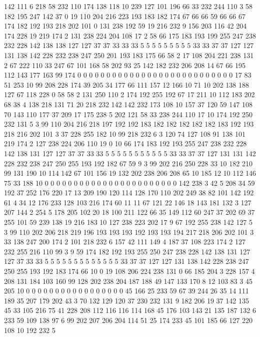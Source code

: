 142 111 6 218 58 232 110 174 138 118 10 239 127 101 196 66 33 232 244 110
3 58 182 195 247 142 37 0 19 110 204 216 223 193 183 182 174 67 66 66
59 66 66 67 174 182 192 193 218 202 101 0 131 238 192 59 19 216 232 9
156 203 116 42 204 174 228 19 219 174 2 131 238 224 204 108 17 2 58 66
175 183 193 199 255 247 238 232 228 142 138 138 127 127 37 37 33 33 33 5
5 5 5 5 5 5 5 5 33 33 37 37 127 127 131 138 142 228 232 238
247 250 201 193 183 175 66 58 2 17 108 204 221 238 131 2 67 222 110 33
247 67 101 168 58 202 93 25 142 182 232 206 208 14 67 66 195 112 143 177
163 99 174 0 0 0 0 0 0 0 0 0 0 0 0 0 0 0 0 0
0 0 0 0 0 0 0 0 0 0 17 83 51 253 10 99 208 228 174 39
205 34 177 66 111 157 12 166 10 71 10 202 138 188 127 67 118 228 0 58
58 2 131 250 110 2 174 192 255 192 67 17 211 10 112 183 202 68 38 4
138 218 131 71 20 218 232 142 142 232 173 108 10 157 37 120 59 147 108 70
143 110 177 37 209 17 175 238 5 202 121 58 33 238 244 110 17 10 174 192
250 232 131 5 3 99 110 204 216 218 197 192 192 183 182 182 182 182 182 183
192 193 218 216 202 101 3 37 228 255 182 10 99 218 232 6 3 120 74 127
108 91 138 101 219 174 2 127 238 224 206 110 19 0 10 66 174 183 192 193
255 247 238 232 228 142 138 131 127 127 37 37 33 33 5 5 5 5 5 5
5 5 5 5 5 33 33 37 37 127 131 131 142 228 232 238 247 250 255 193
192 182 67 59 9 3 99 202 216 250 228 33 10 182 210 99 131 190 10 114
142 67 101 156 19 132 202 238 206 208 65 10 185 12 10 112 146 75 33 188
10 0 0 0 0 0 0 0 0 0 0 0 0 0 0 0 0 0 0 0
0 0 0 0 142 238 3 42 5 208 34 59 192 37 252 176 220 17 13 209
190 120 114 128 170 110 202 249 38 82 101 142 192 61 4 34 12 176 233 128
103 216 174 60 11 11 67 121 22 146 18 143 181 132 3 127 207 144 2 254
5 178 205 102 20 18 100 211 122 66 35 149 112 60 247 37 202 69 37 255
101 59 239 138 19 216 183 10 127 238 223 202 17 9 67 192 255 238 142 127
5 3 99 110 202 206 218 219 196 193 193 193 192 193 193 194 217 218 206 202
101 3 33 138 247 200 174 2 101 218 232 6 157 42 111 149 4 187 37 108
223 174 2 127 232 255 216 110 99 3 9 59 174 182 192 193 255 250 247 238
228 142 138 131 127 127 37 33 33 5 5 5 5 5 5 5 5 5 5 5
5 5 33 37 37 127 127 131 138 142 228 238 247 250 255 193 192 183 174 66
10 0 19 108 206 224 238 131 0 66 185 204 3 228 157 4 208 131 184 103
160 99 128 202 238 204 187 188 49 147 133 170 8 12 103 83 3 45 205 10
0 0 0 0 0 0 0 0 0 0 0 0 0 0 0 0 0 45 166 25
233 59 67 39 244 26 35 14 111 189 35 207 179 202 43 3 70 132 129 120
37 230 232 131 9 182 206 19 37 142 135 45 33 105 216 75 41 228 208 112
116 116 114 168 45 176 103 143 21 135 187 132 6 233 59 109 138 97 6 99
202 207 206 204 114 51 25 174 233 45 101 185 66 127 220 108 10 192 232 5
